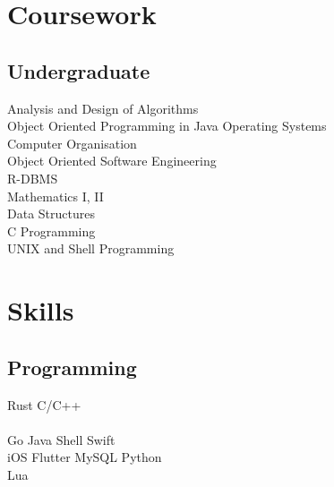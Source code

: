 \documentclass[]{deedy-resume-openfont}
\begin{document}
\begin{minipage}[t]{0.33\textwidth}

\section{Coursework}


\subsection{Undergraduate}
Analysis and Design of Algorithms \\
Object Oriented Programming in Java
Operating Systems \\
Computer Organisation \\
Object Oriented Software Engineering \\
R-DBMS \\
Mathematics  I, II \\
Data Structures \\
C Programming\\

UNIX and Shell Programming \\


\section{Skills}
\subsection{Programming}
Rust \textbullet{}   C/C++   \\
 \\ 
 Go \textbullet{} Java \textbullet{} Shell \textbullet{} Swift  \\
iOS \textbullet{} Flutter \textbullet{} MySQL \textbullet{} Python \\ Lua\\ 
\sectionsep



\end{minipage}
\end{document}
